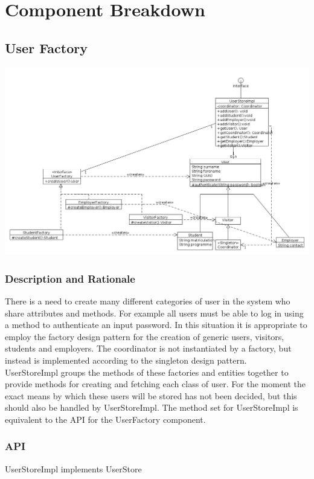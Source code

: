 \documentclass{l3deliverable}
\begin{document}
\section{Component Breakdown}

\subsection{User Factory}
\includegraphics[scale = 0.35]{UserFactoryComponent.png}
\subsubsection{Description and Rationale}
There is a need to create many different categories of user in the system who share attributes and methods. For example all users must be able to log in using a method
to authenticate an input password. In this situation it is appropriate to employ the factory design pattern for the creation of generic users, visitors, students and employers.
The coordinator is not instantiated by a factory, but instead is implemented according to the singleton design pattern. \\
UserStoreImpl groups the methods of these factories and entities together to provide methods for creating and fetching each class of user. For the moment the exact 
means by which these users will be stored has not been decided, but this should also be handled by UserStoreImpl. The method set for UserStoreImpl is equivalent to the API for 
the UserFactory component.
\subsubsection{API}
UserStoreImpl implements UserStore
\end{document}
